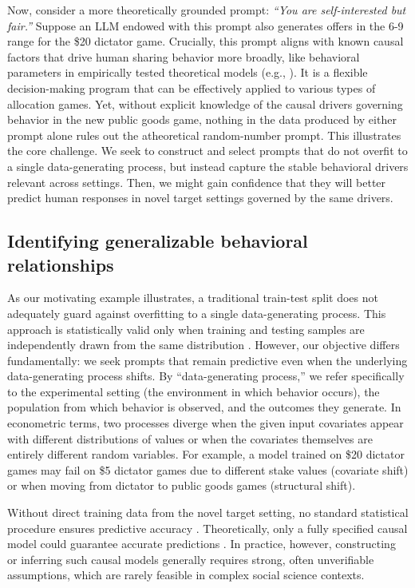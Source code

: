 \documentclass[11pt]{article}
\theoremstyle{definition}
\newcommand{\persona}{prompt}
\begin{document}
Now, consider a more theoretically grounded \persona{}: \emph{``You are self-interested but fair.''}
Suppose an LLM endowed with this \persona{} also generates offers in the 6-9 range for the \$20 dictator game.
Crucially, this \persona{} aligns with known causal factors that drive human sharing behavior more broadly, like behavioral parameters in empirically tested theoretical models (e.g., \cite{charness2002understanding}).
It is a flexible decision-making program that can be effectively applied to various types of allocation games.
Yet, without explicit knowledge of the causal drivers governing behavior in the new public goods game, nothing in the data produced by either \persona{} alone rules out the atheoretical random-number prompt.
This illustrates the core challenge.
We seek to construct and select \persona{s} that do not overfit to a single data-generating process, but instead capture the stable behavioral drivers relevant across settings.
Then, we might gain confidence that they will better predict human responses in novel target settings governed by the same drivers.

\subsection{Identifying generalizable behavioral relationships}

As our motivating example illustrates, a traditional train-test split does not adequately guard against overfitting to a single data-generating process. 
This approach is statistically valid only when training and testing samples are independently drawn from the same distribution \citep{statisticalvapnik1998}. 
However, our objective differs fundamentally: we seek \persona{s} that remain predictive even when the underlying data-generating process shifts.
By ``data-generating process,'' we refer specifically to the experimental setting (the environment in which behavior occurs), the population from which behavior is observed, and the outcomes they generate.
In econometric terms, two processes diverge when the given input covariates appear with different distributions of values or when the covariates themselves are entirely different random variables.
For example, a model trained on \$20 dictator games may fail on \$5 dictator games due to different stake values (covariate shift) or when moving from dictator to public goods games (structural shift).

Without direct training data from the novel target setting, no standard statistical procedure ensures predictive accuracy \citep{ben2010theory,Klivans2024Domain}. 
Theoretically, only a fully specified causal model could guarantee accurate predictions \citep{Pearl2009Causality}. 
In practice, however, constructing or inferring such causal models generally requires strong, often unverifiable assumptions, which are rarely feasible in complex social science contexts.
\end{document}
